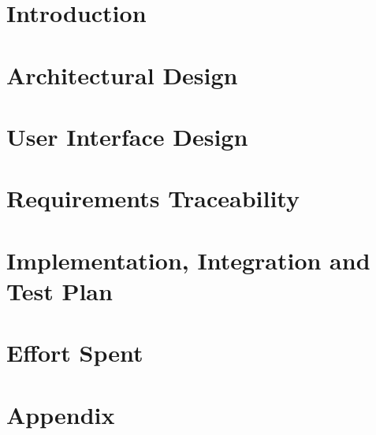 \documentclass[a4paper,12pt]{report}
\begin{document}
\setcounter{tocdepth}{1}
\tableofcontents

\chapter{Introduction}

\clearpage

\chapter{Architectural Design}

\clearpage

\chapter{User Interface Design}

\clearpage

\chapter{Requirements Traceability}

\clearpage

\chapter{Implementation, Integration and Test Plan}

\clearpage

\chapter{Effort Spent}

\clearpage

\appendix
\chapter{Appendix}



\end{document}
